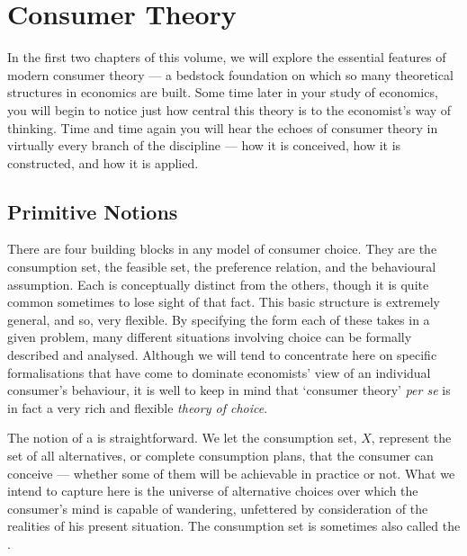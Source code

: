 \documentclass[b5paper]{memoir}
\begin{document}

\mainmatter

\pagestyle{MEst}

\chapter{Consumer Theory}

In the first two chapters of this volume, we will explore the essential features of modern
consumer theory --- a bedstock foundation on which so many theoretical structures in
economics are built. Some time later in your study of economics, you will begin to notice
just how central this theory is to the economist’s way of thinking. Time and time again
you will hear the echoes of consumer theory in virtually every branch of the discipline 
--- how it is conceived, how it is constructed, and how it is applied.

\section{Primitive Notions}

There are four building blocks in any model of consumer choice. 
They are the consumption set, the feasible set, the preference relation, and the behavioural assumption. 
Each is conceptually distinct from the others, though it is quite common sometimes to lose sight
of that fact. This basic structure is extremely general, and so, very flexible. By
specifying the form each of these takes in a given problem, many different situations
involving choice can be formally described and analysed. Although we will tend to
concentrate here on specific formalisations that have come to dominate economists’ view of
an individual consumer’s behaviour, it is well to keep in mind that ‘consumer theory’
\emph{per se} is in fact a very rich and flexible \emph{theory of choice}.

The notion of a  is straightforward. We let the consumption set, $X$,
represent the set of all alternatives, or complete consumption plans, that the consumer
can conceive --- whether some of them will be achievable in practice or not. What we
intend to capture here is the universe of alternative choices over which the consumer’s
mind is capable of wandering, unfettered by consideration of the realities of his present
situation. The consumption set is sometimes also called the .
\end{document}

